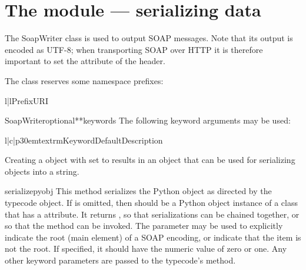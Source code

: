 \chapter{The  module --- serializing data}

The SoapWriter class is used to output SOAP messages.
Note that its output is encoded as UTF-8; when transporting SOAP over
HTTP it is therefore important to set the  attribute
of the  header.

The  class reserves some namespace prefixes:
\begin{tableii}{l|l}{}{Prefix}{URI}
\end{tableii}

\begin{classdesc}{SoapWriter}{optional{**keywords}}
The following keyword arguments may be used:

\begin{tableiii}{l|c|p{30em}}{textrm}{Keyword}{Default}{Description}
\end{tableiii}
\end{classdesc}

Creating a  object with  set to 
results in an object that can be used for serializing objects into a string.

\begin{methoddesc}{serialize}{pyobj}
This method serializes the  Python object as directed
by the  typecode object.
If  is omitted, then  should be a Python
object instance of a class that has a  attribute.
It returns , so that serializations can be chained together, or
so that the  method can be invoked.
The  parameter may be used to explicitly indicate the root
(main element) of a SOAP encoding, or indicate that the item is not the
root.
If specified, it should have the numeric value of zero or one.
Any other keyword parameters are passed to the typecode's 
method.
\end{methoddesc}

